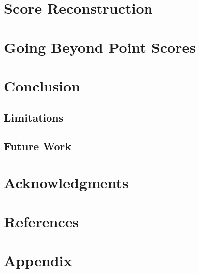 \documentclass{article}
\begin{document}
\section{Score Reconstruction}

\section{Going Beyond Point Scores}
\section{Conclusion}
\subsection{Limitations}
\subsection{Future Work}

\section*{Acknowledgments}
\section*{References}
\section*{Appendix}
\end{document}
